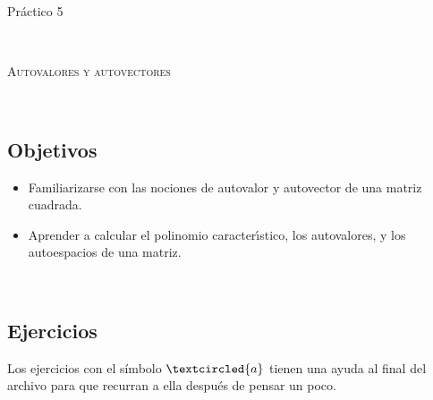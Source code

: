 \documentclass[12pt]{amsart}
\begin{document}
	
	
	\centerline{\Large{Pr\' actico 5}}
	
	\
	
	\centerline{\textsc{Autovalores y autovectores}}
	
	\
	
\subsection*{Objetivos}
	
\begin{itemize}
\item Familiarizarse con las nociones de autovalor y autovector de una matriz cuadrada.

\item Aprender a calcular el polinomio caracter\' \i stico, los autovalores, y los autoespacios de una matriz.
\end{itemize}
	
	\
	
\subsection*{Ejercicios} Los ejercicios con el s\'imbolo $\textcircled{a}$ tienen una ayuda al final del archivo para que recurran a ella despu\'es de pensar un poco.

\
\end{document}

